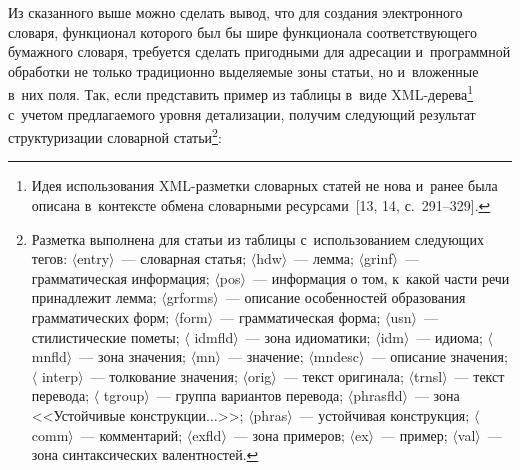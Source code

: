 \begin{multicols}{2}
  Из сказанного выше можно сделать вывод, что для создания электронного 
словаря, функционал которого был бы шире функционала соответствующего 
бумажного словаря, требуется сделать пригодными для адресации 
и~программной обработки не только традиционно выделяемые зоны статьи, но и~вложенные в~них поля. 
Так, если представить пример из таблицы в~виде  
XML-де\-ре\-ва\footnote{Идея использования XML-разметки словарных статей не нова и~ранее 
была описана в~контексте обмена словарными ресурсами~[13, 14, с.~291--329].} с~учетом 
предлагаемого уровня детализации, получим следующий результат 
структуризации словарной статьи\footnote{Разметка выполнена для статьи из таблицы 
с~использованием следующих тегов: $\langle${\sf entry}$\rangle$~--- словарная статья; 
$\langle${\sf hdw}$\rangle$~--- лемма; $\langle${\sf grinf}$\rangle$~--- 
грамматическая информация; $\langle${\sf pos}$\rangle$~--- информация о том, к~какой части 
речи принадлежит лемма; $\langle${\sf grforms}$\rangle$~--- описание особенностей 
образования грамматических форм; $\langle${\sf form}$\rangle$~--- грамматическая форма; 
$\langle${\sf usn}$\rangle$~--- стилистические пометы; $\langle${\sf 
idmfld}$\rangle$~--- зона идиоматики; $\langle${\sf idm}$\rangle$~--- идиома; 
$\langle${\sf mnfld}$\rangle$~--- зона значения; $\langle${\sf mn}$\rangle$~--- 
значение; $\langle${\sf mndesc}$\rangle$~--- описание значения; $\langle${\sf 
interp}$\rangle$~--- толкование значения; $\langle${\sf orig}$\rangle$~--- текст 
оригинала; $\langle${\sf trnsl}$\rangle$~--- текст перевода; $\langle${\sf 
tgroup}$\rangle$~--- группа вариантов перевода; $\langle${\sf phrasfld}$\rangle$~---  
зона <<Устойчивые конструкции$\ldots$>>;
   $\langle${\sf phras}$\rangle$~--- устойчивая конструкция; $\langle${\sf 
comm}$\rangle$~--- комментарий; $\langle${\sf exfld}$\rangle$~--- зона примеров; 
$\langle${\sf ex}$\rangle$~--- пример; $\langle${\sf val}$\rangle$~--- зона 
синтаксических валентностей.}:



\end{multicols}
